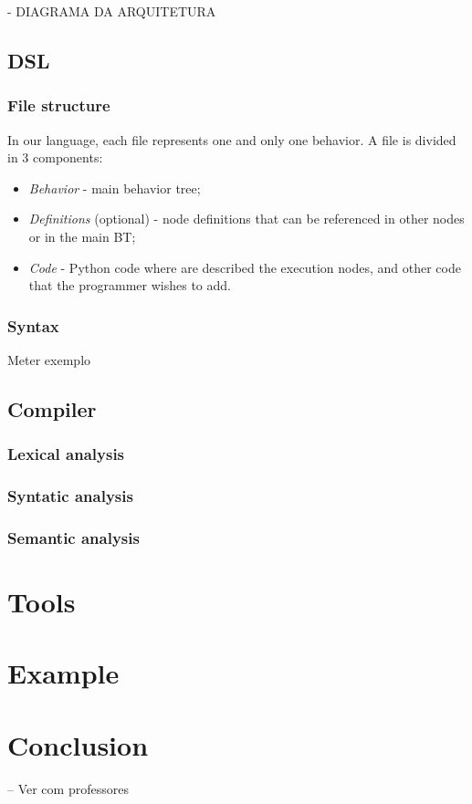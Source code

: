 \documentclass[a4paper,UKenglish,cleveref, autoref, thm-restate]{oasics-v2019}
\begin{document}
- DIAGRAMA DA ARQUITETURA

\subsection{DSL}

\subsubsection{File structure}
In our language, each file represents one and only one behavior.
A file is divided in 3 components:
\begin{itemize}
    \item \textit{Behavior} - main behavior tree;
    \item \textit{Definitions} (optional) - node definitions that can be referenced in other nodes or in the main BT;
    \item \textit{Code} - Python code where are described the execution nodes, and other code that the programmer wishes to add.
\end{itemize}

\subsubsection{Syntax}
Meter exemplo

\subsection{Compiler}
\subsubsection{Lexical analysis}

\subsubsection{Syntatic analysis}

\subsubsection{Semantic analysis}

\section{Tools}
\label{sec:tools}

\section{Example}
\label{sec:example}


\section{Conclusion}
\label{sec:conclusion}

-- Ver com professores


\end{document}
